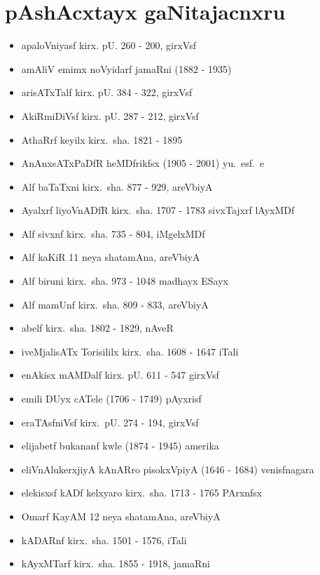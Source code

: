 \newpage
\section*{pAshAcxtayx gaNitajacnxru}

{\renewcommand\labelitemi{}
\begin{itemize}
\item apaloVniyasf kirx. pU. {\rm 260 - 200}, girxVsf
\item amAliV emimx noVyidarf jamaRni {\rm (1882 - 1935)}
\item arisATxTalf kirx. pU. {\rm 384 - 322}, girxVsf
\item AkiRmiDiVsf kirx. pU. {\rm 287 - 212}, girxVsf
\item AthaRrf keyilx kirx.~sha. {\rm 1821 - 1895}
\item AnAnxsATxPaDfR heMDfrikfsx {\rm (1905 - 2001)} yu.~esf.~e
\item Alf baTaTxni kirx.~sha. {\rm 877 - 929}, areVbiyA
\item Ayalxrf liyoVnADfR kirx.~sha. {\rm 1707 - 1783} sivxTajxrf lAyxMDf
\item Alf sivxnf kirx.~sha. {\rm 735 - 804}, iMgelxMDf
\item Alf kaKiR {\rm 11} neya shatamAna, areVbiyA
\item Alf biruni kirx.~sha. {\rm 973 - 1048} madhayx ESayx
\item Alf mamUnf kirx.~sha. {\rm 809 - 833}, areVbiyA
\item abelf kirx.~sha. {\rm 1802 - 1829}, nAveR
\item iveMjalisATx Torisililx kirx.~sha. {\rm 1608 - 1647} iTali
\item enAkisx mAMDalf kirx. pU. {\rm 611 - 547} girxVsf
\item emili DUyx cATele {\rm (1706 - 1749)} pAyxrisf
\item eraTAsfniVsf kirx.~pU. {\rm 274 - 194}, girxVsf
\item elijabetf bukananf kwle {\rm (1874 - 1945)} amerika
\item eliVnAlukerxjiyA kAnARro pisokxVpiyA {\rm (1646 - 1684)} venisfnagara
\item elekisxsf kADf kelxyaro kirx.~sha. {\rm 1713 - 1765} PArxnfsx
\item Omarf KayAM {\rm 12} neya shatamAna, areVbiyA
\item kADARnf kirx.~sha. {\rm 1501 - 1576}, iTali
\item kAyxMTarf kirx.~sha. {\rm 1855 - 1918}, jamaRni

\end{itemize}}
